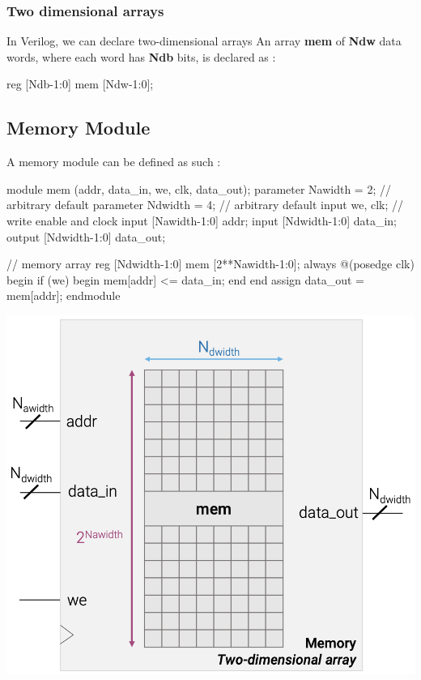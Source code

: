 \documentclass[12pt,openany]{book}
\begin{document}
\subsubsection{Two dimensional arrays}
In Verilog, we can declare two-dimensional arrays
An array \textbf{mem} of \textbf{Ndw} data words, where each word has \textbf{Ndb} bits, is declared as :
\begin{center}
	\begin{vhdl}
reg [Ndb-1:0] mem [Ndw-1:0];
	\end{vhdl}
\end{center}

\subsection{Memory Module}
A memory module can be defined as such :\newline
\vspace*{5px}
\begin{minipage}{0.45\textwidth}
	\begin{vhdl}
module mem (addr, data_in, we, clk, data_out);
	parameter Nawidth = 2; // arbitrary default
	parameter Ndwidth = 4; // arbitrary default
	input we, clk; // write enable and clock
	input [Nawidth-1:0] addr;
	input [Ndwidth-1:0] data_in;
	output [Ndwidth-1:0] data_out;

	// memory array
	reg [Ndwidth-1:0] mem [2**Nawidth-1:0];
	always @(posedge clk) begin
	if (we) begin
		mem[addr] <= data_in;
	end
	end
	assign data_out = mem[addr];
endmodule
\end{vhdl}
\end{minipage}
\hfill
\vline
\hfill
\begin{minipage}[htp]{0.45\textwidth}
	\centering
	\includegraphics[width=1\textwidth]{circuits/16.2.4.png}
\end{minipage}
\end{document}
